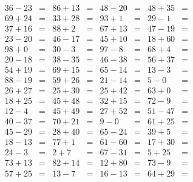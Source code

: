 \documentclass[12pt, a4paper]{article}
\begin{document}
\begin{align*}
36-23&= & 86+13&= & 48-20&= & 48+35&=\\
69+24&= & 33+28&= & 93+1&= & 29-1&=\\
37+16&= & 88+2&= & 67+13&= & 47-19&=\\
23-20&= & 46-17&= & 45+10&= & 18+60&=\\
98+0&= & 30-3&= & 97-8&= & 68+4&=\\
20-18&= & 38-35&= & 46-38&= & 56+37&=\\
54+19&= & 69+15&= & 65-14&= & 13-3&=\\
88-19&= & 59+26&= & 21-14&= & 5-0&=\\
26+27&= & 25+30&= & 25+42&= & 63+0&=\\
18+25&= & 45+48&= & 32+15&= & 72-9&=\\
12-4&= & 45+49&= & 27+52&= & 51-47&=\\
40-37&= & 70+21&= & 9-0&= & 61+25&=\\
45-29&= & 28+40&= & 65-24&= & 39+5&=\\
18-13&= & 77+1&= & 61-60&= & 17+30&=\\
24-3&= & 2+7&= & 67-31&= & 5+25&=\\
73+13&= & 82+14&= & 12+80&= & 73-9&=\\
57+25&= & 13-7&= & 16-13&= & 64+29&=
\end{align*}
\end{document}
